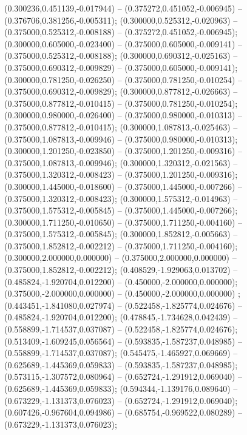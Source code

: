  (0.300236,0.451139,-0.017944) -- (0.375272,0.451052,-0.006945) -- (0.376706,0.381256,-0.005311);
 (0.300000,0.525312,-0.020963) -- (0.375000,0.525312,-0.008188) -- (0.375272,0.451052,-0.006945);
 (0.300000,0.605000,-0.023400) -- (0.375000,0.605000,-0.009141) -- (0.375000,0.525312,-0.008188);
 (0.300000,0.690312,-0.025163) -- (0.375000,0.690312,-0.009829) -- (0.375000,0.605000,-0.009141);
 (0.300000,0.781250,-0.026250) -- (0.375000,0.781250,-0.010254) -- (0.375000,0.690312,-0.009829);
 (0.300000,0.877812,-0.026663) -- (0.375000,0.877812,-0.010415) -- (0.375000,0.781250,-0.010254);
 (0.300000,0.980000,-0.026400) -- (0.375000,0.980000,-0.010313) -- (0.375000,0.877812,-0.010415);
 (0.300000,1.087813,-0.025463) -- (0.375000,1.087813,-0.009946) -- (0.375000,0.980000,-0.010313);
 (0.300000,1.201250,-0.023850) -- (0.375000,1.201250,-0.009316) -- (0.375000,1.087813,-0.009946);
 (0.300000,1.320312,-0.021563) -- (0.375000,1.320312,-0.008423) -- (0.375000,1.201250,-0.009316);
 (0.300000,1.445000,-0.018600) -- (0.375000,1.445000,-0.007266) -- (0.375000,1.320312,-0.008423);
 (0.300000,1.575312,-0.014963) -- (0.375000,1.575312,-0.005845) -- (0.375000,1.445000,-0.007266);
 (0.300000,1.711250,-0.010650) -- (0.375000,1.711250,-0.004160) -- (0.375000,1.575312,-0.005845);
 (0.300000,1.852812,-0.005663) -- (0.375000,1.852812,-0.002212) -- (0.375000,1.711250,-0.004160);
 (0.300000,2.000000,0.000000) -- (0.375000,2.000000,0.000000) -- (0.375000,1.852812,-0.002212);
 (0.408529,-1.929063,0.013702) -- (0.485824,-1.920704,0.012200) -- (0.450000,-2.000000,0.000000);
 (0.375000,-2.000000,0.000000) -- (0.450000,-2.000000,0.000000) ;
 (0.443451,-1.841080,0.027974) -- (0.522458,-1.825774,0.024676) -- (0.485824,-1.920704,0.012200);
 (0.478845,-1.734628,0.042439) -- (0.558899,-1.714537,0.037087) -- (0.522458,-1.825774,0.024676);
 (0.513409,-1.609245,0.056564) -- (0.593835,-1.587237,0.048985) -- (0.558899,-1.714537,0.037087);
 (0.545475,-1.465927,0.069669) -- (0.625689,-1.445369,0.059833) -- (0.593835,-1.587237,0.048985);
 (0.573115,-1.307572,0.080964) -- (0.652724,-1.291912,0.069040) -- (0.625689,-1.445369,0.059833);
 (0.594344,-1.139176,0.089640) -- (0.673229,-1.131373,0.076023) -- (0.652724,-1.291912,0.069040);
 (0.607426,-0.967604,0.094986) -- (0.685754,-0.969522,0.080289) -- (0.673229,-1.131373,0.076023);
